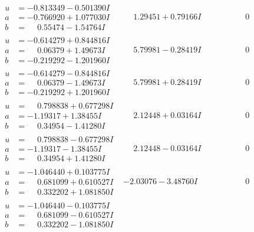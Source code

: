 \documentclass[1p]{elsarticle_modified}
\theoremstyle{definition}
\begin{document}
$$\begin{array}{c|c|c}
\begin{aligned}
u &= -0.813349 - 0.501390 I \\
a &= -0.766920 + 1.077030 I \\
b &= \phantom{-}0.55474 - 1.54764 I\end{aligned}
 & \phantom{-}1.29451 + 0.79166 I & \phantom{-0.000000 } 0 \\ \hline\begin{aligned}
u &= -0.614279 + 0.844816 I \\
a &= \phantom{-}0.06379 + 1.49673 I \\
b &= -0.219292 - 1.201960 I\end{aligned}
 & \phantom{-}5.79981 - 0.28419 I & \phantom{-0.000000 } 0 \\ \hline\begin{aligned}
u &= -0.614279 - 0.844816 I \\
a &= \phantom{-}0.06379 - 1.49673 I \\
b &= -0.219292 + 1.201960 I\end{aligned}
 & \phantom{-}5.79981 + 0.28419 I & \phantom{-0.000000 } 0 \\ \hline\begin{aligned}
u &= \phantom{-}0.798838 + 0.677298 I \\
a &= -1.19317 + 1.38455 I \\
b &= \phantom{-}0.34954 - 1.41280 I\end{aligned}
 & \phantom{-}2.12448 + 0.03164 I & \phantom{-0.000000 } 0 \\ \hline\begin{aligned}
u &= \phantom{-}0.798838 - 0.677298 I \\
a &= -1.19317 - 1.38455 I \\
b &= \phantom{-}0.34954 + 1.41280 I\end{aligned}
 & \phantom{-}2.12448 - 0.03164 I & \phantom{-0.000000 } 0 \\ \hline\begin{aligned}
u &= -1.046440 + 0.103775 I \\
a &= \phantom{-}0.681099 + 0.610527 I \\
b &= \phantom{-}0.332202 + 1.081850 I\end{aligned}
 & -2.03076 - 3.48760 I & \phantom{-0.000000 } 0 \\ \hline\begin{aligned}
u &= -1.046440 - 0.103775 I \\
a &= \phantom{-}0.681099 - 0.610527 I \\
b &= \phantom{-}0.332202 - 1.081850 I\end{aligned}

\end{array}$$
\end{document}
